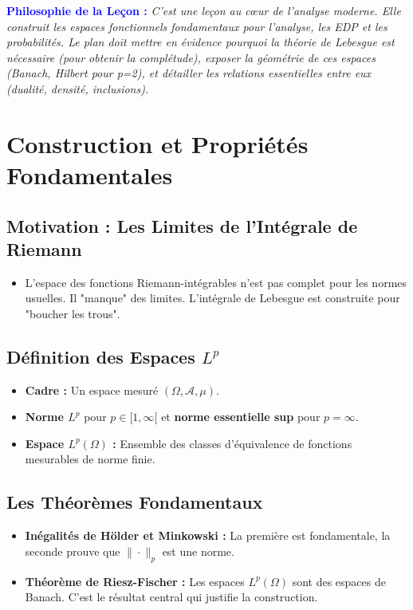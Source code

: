 \documentclass[12pt, a4paper, parskip=full]{report}
\theoremstyle{agregstyle}
\newenvironment{philosophie}
  {\par\medskip\noindent\begin{oframed}\noindent\textbf{\textcolor{blue}{Philosophie de la Leçon :}}\itshape}
  {\end{oframed}\par\medskip}
\begin{document}
\begin{philosophie}
    C'est une leçon au cœur de l'analyse moderne. Elle construit les espaces fonctionnels fondamentaux pour l'analyse, les EDP et les probabilités. Le plan doit mettre en évidence pourquoi la théorie de Lebesgue est nécessaire (pour obtenir la complétude), exposer la géométrie de ces espaces (Banach, Hilbert pour p=2), et détailler les relations essentielles entre eux (dualité, densité, inclusions).
\end{philosophie}

\section{Construction et Propriétés Fondamentales}
\subsection{Motivation : Les Limites de l'Intégrale de Riemann}
\begin{itemize}
    \item L'espace des fonctions Riemann-intégrables n'est pas complet pour les normes usuelles. Il "manque" des limites. L'intégrale de Lebesgue est construite pour "boucher les trous".
\end{itemize}
\subsection{Définition des Espaces $L^p$}
\begin{itemize}
    \item \textbf{Cadre :} Un espace mesuré $(\Omega, \mathcal{A}, \mu)$.
    \item \textbf{Norme $L^p$} pour $p \in [1, \infty[$ et \textbf{norme essentielle sup} pour $p=\infty$.
    \item \textbf{Espace $L^p(\Omega)$ :} Ensemble des classes d'équivalence de fonctions mesurables de norme finie.
\end{itemize}
\subsection{Les Théorèmes Fondamentaux}
\begin{itemize}
    \item \textbf{Inégalités de Hölder et Minkowski :} La première est fondamentale, la seconde prouve que $\|\cdot\|_p$ est une norme.
    \item \textbf{Théorème de Riesz-Fischer :} Les espaces $L^p(\Omega)$ sont des espaces de Banach. C'est le résultat central qui justifie la construction.
\end{itemize}
\end{document}
